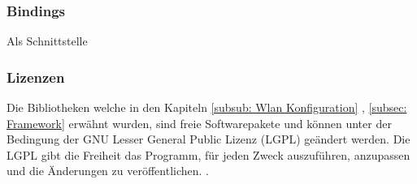 \subsubsection{Bindings}
Als Schnittstelle 

   
\subsubsection{Lizenzen} 
Die Bibliotheken welche in den Kapiteln \ref{subsub: Wlan Konfiguration} , \ref{subsec: Framework} erwähnt wurden, sind freie Softwarepakete und können unter der Bedingung der GNU Lesser General Public Lizenz (LGPL) geändert werden. Die LGPL gibt die Freiheit das Programm, für jeden Zweck auszuführen, anzupassen und die Änderungen zu veröffentlichen. \cite{noauthor_gnu.org_nodate}.


 
